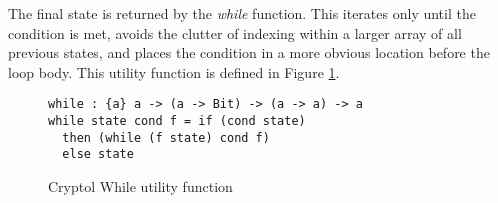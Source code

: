 The final state is returned by the \emph{while} function. This iterates only until the 
condition is met, avoids the clutter of indexing within a larger array of all previous 
states, and places the condition in a more obvious location before the loop body. This 
utility function is defined in Figure \ref{fig:cryptolWhile}.

\begin{figure}[h]
  \centering
\begin{lstlisting}[language=Cryptol]
while : {a} a -> (a -> Bit) -> (a -> a) -> a
while state cond f = if (cond state)
  then (while (f state) cond f)	
  else state
\end{lstlisting}
\caption{Cryptol While utility function}
\label{fig:cryptolWhile}
\end{figure}